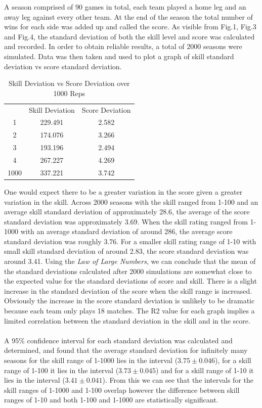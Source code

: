 \documentclass[12pt]{article}
\begin{document}
A season comprised of 90 games in total, each team played a home leg and an away leg against every other team. At the end of the season the total number of wins for each side was added up and called the score. As visible from Fig.1, Fig.3 and Fig.4, the standard deviation of both the skill level and score was calculated and recorded. In order to obtain reliable results, a total of 2000 seasons were simulated. Data was then taken and used to plot a graph of skill standard deviation vs score standard deviation.
\begin{table}[h]
\centering
\begin{tabular}{ccc}
     & Skill Deviation & Score Deviation \\
1    & 229.491         & 2.582           \\
2    & 174.076         & 3.266           \\
3    & 193.196         & 2.494           \\
4    & 267.227         & 4.269           \\
1000 & 337.221         & 3.742          
\end{tabular}
\caption{Skill Deviation vs Score Deviation over 1000 Reps}
\end{table}
One would expect there to be a greater variation in the score given a greater variation in the skill. Across 2000 seasons with the skill ranged from 1-100 and an average skill standard deviation of approximately 28.6, the average of the score standard deviation was approximately 3.69. When the skill rating ranged from 1-1000 with an average standard deviation of around 286, the average score standard deviation was roughly 3.76. For a smaller skill rating range of 1-10 with small skill standard deviation of around 2.83, the score standard deviation was around 3.41. Using the \emph{Law of Large Numbers}, we can conclude that the mean of the standard deviations calculated after 2000 simulations are somewhat close to the expected value for the standard deviations of score and skill. There is a slight increase in the standard deviation of the score when the skill range is increased. Obviously the increase in the score standard deviation is unlikely to be dramatic because each team only plays 18 matches. The R2 value for each graph implies a limited correlation between the standard deviation in the skill and in the score.
\\\\
A 95\% confidence interval for each standard deviation was calculated and determined, and found that the average standard deviation for infinitely many seasons for the skill range of 1-1000 lies in the interval ($3.75 \pm 0.046$), for a skill range of 1-100 it lies in the interval ($3.73 \pm 0.045$) and for a skill range of 1-10 it lies in the interval ($3.41 \pm 0.041$). From this we can see that the intervals for the skill ranges of 1-1000 and 1-100 overlap however the difference between skill ranges of 1-10 and both 1-100 and 1-1000 are statistically significant.
\end{document}
